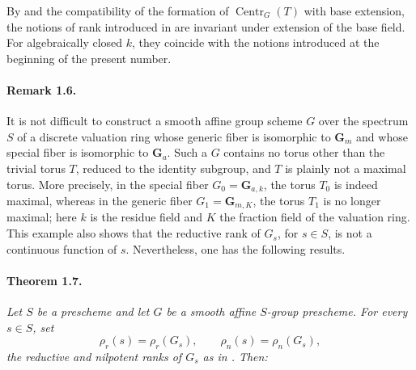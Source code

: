By  and the compatibility of the formation of
\(\operatorname{Centr}_G(T)\) with base extension, the notions of rank
introduced in  are invariant under extension of the base field.
For algebraically closed \(k\), they coincide with the notions
introduced at the beginning of the present number.

\paragraph{\textbf{Remark 1.6.}}
It is not difficult to construct a smooth affine group scheme \(G\)
over the spectrum \(S\) of a discrete valuation ring whose generic
fiber is isomorphic to \(\mathbf G_m\) and whose special fiber is
isomorphic to \(\mathbf G_a\). Such a \(G\) contains no torus other
than the trivial torus \(T\), reduced to the identity subgroup, and
\(T\) is plainly not a maximal torus. More precisely, in the special
fiber \(G_0=\mathbf G_{a,k}\), the torus \(T_0\) is indeed maximal,
whereas in the generic fiber \(G_1=\mathbf G_{m,K}\), the torus
\(T_1\) is no longer maximal; here \(k\) is the residue field and
\(K\) the fraction field of the valuation ring. This example also
shows that the reductive rank of \(G_s\), for \(s\in S\), is not a
continuous function of \(s\). Nevertheless, one has the following
results.

\paragraph{\textbf{Theorem 1.7.}}
\emph{Let \(S\) be a prescheme and let \(G\) be a smooth affine
\(S\)-group prescheme. For every \(s\in S\), set
\[
  \rho_r(s)=\rho_r(G_s),\qquad
  \rho_n(s)=\rho_n(G_s),
\]
the reductive and nilpotent ranks of \(G_s\) as in . Then:}

